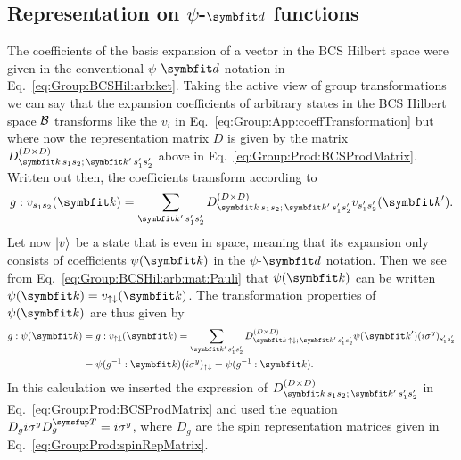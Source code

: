 \subsection{Representation on $\psi$-$\v{d}$ functions}
\label{sec:Group:pdRep}

The coefficients of the basis expansion of a vector in the BCS Hilbert space were given in the conventional $\psi$-$\v{d}$ notation in 
Eq.~\eqref{eq:Group:BCSHil:arb:ket}. Taking the active view of group transformations we can say that the expansion coefficients of arbitrary states
in the BCS Hilbert space $\mathcal{B}$ transforms like the $v_i$ in Eq.~\eqref{eq:Group:App:coeffTransformation} but where now the representation
matrix $D$ is given by the matrix $D^{(D\times D)}_{\v{k}\,s_1s_2;\,\v{k}'\,s_1's_2'}$ above in Eq.~\eqref{eq:Group:Prod:BCSProdMatrix}. Written
out then, the coefficients transform according to
\begin{equation}
    \label{eq:Group:pdRep:coeffTrans}
    g:v_{s_1s_2}(\v{k}) = \sum_{\v{k}'\,s_1's_2'}D^{(D\times D)}_{\v{k}\,s_1s_2;\,\v{k}'\,s_1's_2'}v_{s_1's_2'}(\v{k}').
\end{equation}
Let now $\lvert v \rangle$ be a state that is even in space, meaning that its expansion only consists of coefficients $\psi(\v{k})$ in the $\psi$-$\v{d}$
notation. Then we see from Eq.~\eqref{eq:Group:BCSHil:arb:mat:Pauli} that $\psi(\v{k})$ can be written $\psi(\v{k}) = v_{\up\dn}(\v{k})$.
The transformation properties of $\psi(\v{k})$ are thus given by
\begin{equation}
    \label{eq:Group:pdRep:psiRep}
    \begin{split}
        g:\psi(\v{k}) &= g:v_{\up\dn}(\v{k}) = \sum_{\v{k}'\,s_1's_2'}D^{(D\times D)}_{\v{k}\,\up\dn;\,\v{k}'\,s_1's_2'}\psi(\v{k}')(i\sigma^y)_{s_1's_2'}\\
        &=\psi(g^{-1}:\v{k})\big(i\sigma^y)_{\up\dn} = \psi(g^{-1}:\v{k}).
    \end{split}
\end{equation}
In this calculation we inserted the expression of $D^{(D\times D)}_{\v{k}\,s_1s_2;\,\v{k}'\,s_1's_2'}$ in Eq.~\eqref{eq:Group:Prod:BCSProdMatrix} and used
the equation $D_gi\sigma^y D_g^\trans = i\sigma^y$, where $D_g$ are the spin representation matrices given in Eq.~\eqref{eq:Group:Prod:spinRepMatrix}.

